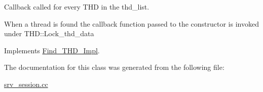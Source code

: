 Callback called for every T\+HD in the thd\+\_\+list.

When a thread is found the callback function passed to the constructor is invoked under T\+H\+D\+::\+Lock\+\_\+thd\+\_\+data 

Implements \mbox{\hyperlink{classFind__THD__Impl_a9241342847e36bfb0c4d8330df033b4b}{Find\+\_\+\+T\+H\+D\+\_\+\+Impl}}.



The documentation for this class was generated from the following file\+:\begin{DoxyCompactItemize}
\item 
\mbox{\hyperlink{srv__session_8cc}{srv\+\_\+session.\+cc}}\end{DoxyCompactItemize}
